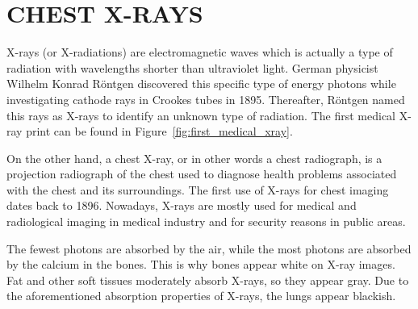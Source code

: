 \chapter{CHEST X-RAYS}
\label{ch:CH2}

X-rays (or X-radiations) are electromagnetic waves which is actually a type of radiation with wavelengths shorter than ultraviolet light. German physicist Wilhelm Konrad Röntgen discovered this specific type of energy photons while investigating cathode rays in Crookes tubes in 1895. Thereafter, Röntgen named this rays as X-rays to identify an unknown type of radiation. The first medical X-ray print can be found in Figure~\ref{fig:first_medical_xray}. 

On the other hand, a chest X-ray, or in other words a chest radiograph, is a projection radiograph of the chest used to diagnose health problems associated with the chest and its surroundings. The first use of X-rays for chest imaging dates back to 1896. Nowadays, X-rays are mostly used for medical and radiological imaging in medical industry and for security reasons in public areas.

The fewest photons are absorbed by the air, while the most photons are absorbed by the calcium in the bones. This is why bones appear white on X-ray images. Fat and other soft tissues moderately absorb X-rays, so they appear gray. Due to the aforementioned absorption properties of X-rays, the lungs appear blackish.

